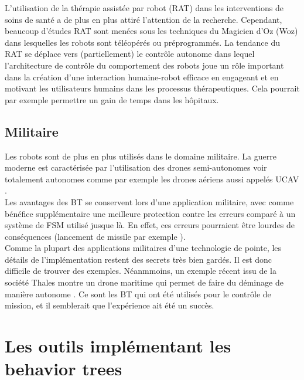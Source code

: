 \documentclass[titlepage]{article}
\begin{document}
		L’utilisation de la thérapie assistée par robot (RAT) dans les interventions de soins de santé a de plus en plus attiré l’attention de la recherche. Cependant, beaucoup d’études RAT sont menées sous les techniques du Magicien d’Oz (Woz) dans lesquelles les robots sont téléopérés ou préprogrammés. La tendance du RAT se déplace vers (partiellement) le contrôle autonome dans lequel l’architecture de contrôle du comportement des robots joue un rôle important dans la création d’une interaction humaine-robot efficace en engageant et en motivant les utilisateurs humains dans les processus thérapeutiques. \cite{rat} 
		Cela pourrait par exemple permettre un gain de temps dans les hôpitaux. 
	
		\subsection{Militaire}
		Les robots sont de plus en plus utilisés dans le domaine militaire. La guerre moderne est caractérisée par l'utilisation des drones semi-autonomes voir totalement autonomes comme par exemple les drones aériens aussi appelés UCAV \cite{wikipedia_UCAV}.
		\\
		Les avantages des BT se conservent lors d'une application militaire, avec comme bénéfice supplémentaire une meilleure protection contre les erreurs comparé à un système de FSM utilisé jusque là. En effet, ces erreurs pourraient être lourdes de conséquences (lancement de missile par exemple \cite{figaro_2018}).
		\\
		Comme la plupart des applications militaires d'une technologie de pointe, les détails de l'implémentation restent des secrets très bien gardés. Il est donc difficile de trouver des exemples.
		Néanmmoins, un exemple récent issu de la société Thales montre un drone maritime qui permet de faire du déminage de manière autonome \cite{mer_et_marine_2018}. Ce sont les BT qui ont été utilisés pour le contrôle de mission, et il semblerait que l'expérience ait été un succès.

	\section{Les outils implémentant les behavior trees}
\end{document}

